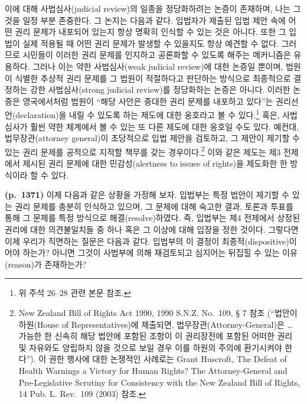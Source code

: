 \documentclass[a4paper,12pt,oneside]{article}  %
\begin{document}
이에 대해 사법심사(judicial review)의 일종을 정당화하려는 논증이
존재하며, 나는 그것을 일정 부분 존중한다. 그 논지는 다음과 같다.
입법자가 제출된 입법 제안 속에 어떤 권리 문제가 내포되어 있는지 항상
명확히 인식할 수 있는 것은 아니다. 또한 그 입법이 실제 적용될 때 어떤
권리 문제가 발생할 수 있을지도 항상 예견할 수 없다. 그러므로 시민들이
이러한 권리 문제를 인지하고 공론화할 수 있도록 해주는 메커니즘은
유용하다. 그러나 이는 약한 사법심사(weak judicial review)에 대한 논증일
뿐이며, 법원이 식별한 추상적 권리 문제를 그 법원이 적절하다고 판단하는
방식으로 최종적으로 결정하는 강한 사법심사(strong judicial review)를
정당화하는 논증은 아니다. 이러한 논증은 영국에서처럼 법원이 ``해당
사안은 중대한 권리 문제를 내포하고 있다''는 권리선언(declaration)을 내릴
수 있도록 하는 제도에 대한 옹호라고 볼 수 있다.\footnote{위 주석 26--28
  관련 본문 참조.} 혹은, 사법심사가 훨씬 약한 체계에서 볼 수 있는 또
다른 제도에 대한 옹호일 수도 있다. 예컨대, 법무장관(attorney general)이
초당적으로 입법 제안을 검토하고, 그 제안이 제기할 수 있는 권리 문제를
공적으로 지적할 책무를 갖는 경우이다.\footnote{New Zealand Bill of
  Rights Act 1990, 1990 S.N.Z. No.~109, § 7 참조 (``법안이 하원(House of
  Representatives)에 제출되면, 법무장관(Attorney-General)은 \ldots{}
  가능한 한 신속히 해당 법안에 포함된 조항이 이 권리장전에 포함된 어떠한
  권리 및 자유와도 양립하지 않을 것으로 보일 경우 이를 하원의 주의에
  환기시켜야 한다''). 이 권한 행사에 대한 논쟁적인 사례로는 Grant
  Huscroft, The Defeat of Health Warnings a Victory for Human Rights?
  The Attorney-General and Pre-Legislative Scrutiny for Consistency with
  the New Zealand Bill of Rights, 14 Pub. L. Rev.~109 (2003) 참조.} 이와
같은 제도는 제3 전제에서 제시된 권리 문제에 대한 민감성(alertness to
issues of rights)을 제도화한 한 방식이라 할 수 있다.

\textbf{(p.~1371)} 이제 다음과 같은 상황을 가정해 보자. 입법부는 특정
법안이 제기할 수 있는 권리 문제를 충분히 인식하고 있으며, 그 문제에 대해
숙고한 결과, 토론과 투표를 통해 그 문제를 특정 방식으로
해결(resolve)하였다. 즉, 입법부는 제4 전제에서 상정된 권리에 대한
의견불일치들 중 하나 혹은 그 이상에 대해 입장을 정한 것이다. 그렇다면
이제 우리가 직면하는 질문은 다음과 같다. 입법부의 이 결정이
최종적(dispositive)이어야 하는가? 아니면 그것이 사법부에 의해 재검토되고
심지어는 뒤집힐 수 있는 이유(reason)가 존재하는가?
\end{document}

